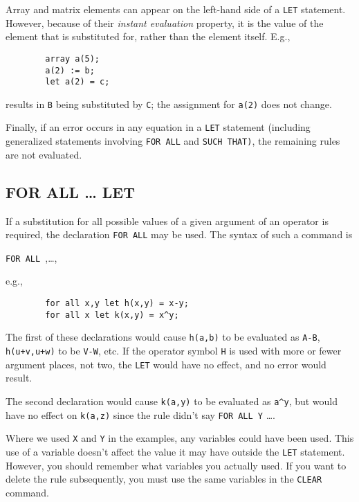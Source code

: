 Array and matrix elements can appear on the left-hand side of a \texttt{LET}
statement. However, because of their 
\emph{instant evaluation} property, it is the value of the element that
is substituted for, rather than the element itself.  E.g.,
\begin{verbatim}
        array a(5);
        a(2) := b;
        let a(2) = c;
\end{verbatim}
results in \texttt{B} being substituted by \texttt{C}; the assignment for
\texttt{a(2)} does not change.

Finally, if an error occurs in any equation in a \texttt{LET} statement
(including generalized statements involving \texttt{FOR ALL} and {\tt SUCH
THAT)}, the remaining rules are not evaluated.

\subsection{FOR ALL \ldots{} LET}
\hypertarget{command:FORALL}{}
If a substitution for all possible values of a given argument of an
operator is required, the declaration \texttt{FOR ALL} may be used. The
syntax of such a command is
\begin{syntaxtable}
   \texttt{FOR ALL },\dots, \\
   \qquad  {} 
\end{syntaxtable}
e.g.,
\begin{verbatim}
        for all x,y let h(x,y) = x-y;
        for all x let k(x,y) = x^y;
\end{verbatim}
The first of these declarations would cause \texttt{h(a,b)} to be evaluated
as \texttt{A-B}, \texttt{h(u+v,u+w)} to be \texttt{V-W}, etc.  If the operator
symbol \texttt{H} is used with more or fewer argument places, not two, the
\texttt{LET} would have no effect, and no error would result.

The second declaration would cause \texttt{k(a,y)} to be evaluated as
\texttt{a\textasciicircum y}, but would have no effect on \texttt{k(a,z)} since the rule
didn't say \texttt{FOR ALL Y} \ldots .

Where we used \texttt{X} and \texttt{Y} in the examples, any variables could
have been used.  This use of a variable doesn't affect the value it may
have outside the \texttt{LET} statement.  However, you should remember what
variables you actually used.  If you want to delete the rule subsequently,
you must use the same variables in the \texttt{CLEAR} command.

